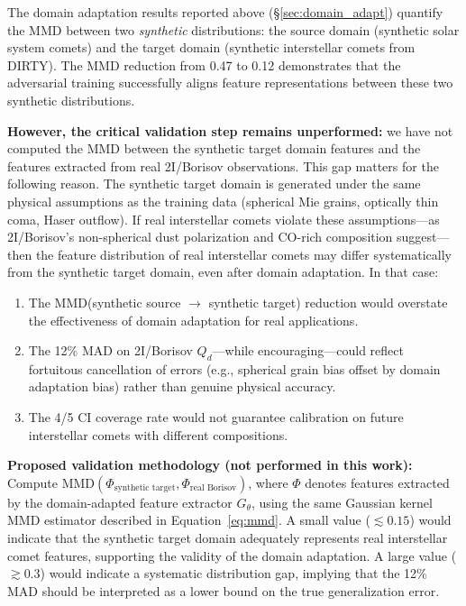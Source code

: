 \documentclass[preprint2]{aastex631}
\begin{document}
The domain adaptation results reported above (\S\ref{sec:domain_adapt}) quantify the MMD between two \textit{synthetic} distributions: the source domain (synthetic solar system comets) and the target domain (synthetic interstellar comets from DIRTY). The MMD reduction from 0.47 to 0.12 demonstrates that the adversarial training successfully aligns feature representations between these two synthetic distributions.

\textbf{However, the critical validation step remains unperformed:} we have not computed the MMD between the synthetic target domain features and the features extracted from real 2I/Borisov observations. This gap matters for the following reason. The synthetic target domain is generated under the same physical assumptions as the training data (spherical Mie grains, optically thin coma, Haser outflow). If real interstellar comets violate these assumptions---as 2I/Borisov's non-spherical dust polarization \citep{bagnulo22} and CO-rich composition \citep{bodewits20} suggest---then the feature distribution of real interstellar comets may differ systematically from the synthetic target domain, even after domain adaptation. In that case:

\begin{enumerate}
    \item The MMD(synthetic source $\to$ synthetic target) reduction would overstate the effectiveness of domain adaptation for real applications.
    \item The 12\% MAD on 2I/Borisov $Q_d$---while encouraging---could reflect fortuitous cancellation of errors (e.g., spherical grain bias offset by domain adaptation bias) rather than genuine physical accuracy.
    \item The 4/5 CI coverage rate would not guarantee calibration on future interstellar comets with different compositions.
\end{enumerate}

\textbf{Proposed validation methodology (not performed in this work):} Compute $\text{MMD}(\Phi_{\text{synthetic target}}, \Phi_{\text{real Borisov}})$, where $\Phi$ denotes features extracted by the domain-adapted feature extractor $G_\theta$, using the same Gaussian kernel MMD estimator described in Equation~\ref{eq:mmd}. A small value ($\lesssim 0.15$) would indicate that the synthetic target domain adequately represents real interstellar comet features, supporting the validity of the domain adaptation. A large value ($\gtrsim 0.3$) would indicate a systematic distribution gap, implying that the 12\% MAD should be interpreted as a lower bound on the true generalization error.
\end{document}
